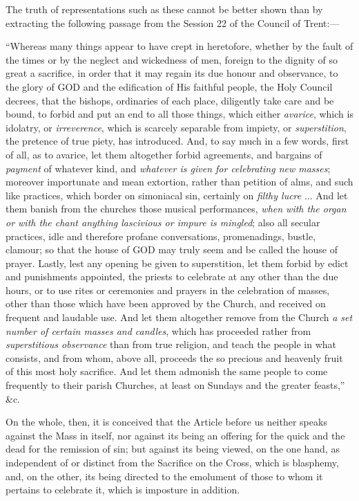 The truth of representations such as these cannot be better shown
than by extracting the following passage from the Session 22 of the
Council of Trent:—

``Whereas many things appear to have crept in
heretofore, whether by the fault of the times or by the neglect and
wickedness of men, foreign to the dignity of so great a sacrifice, in
order that it may regain its due honour and observance, to the glory
of GOD and the edification
of His faithful people, the Holy Council decrees, that the bishops,
ordinaries of each place, diligently take care and be bound, to forbid
and put an end to all those things, which either \emph{avarice}, which
is idolatry, or \emph{irreverence}, which is scarcely separable from
impiety, or \emph{superstition}, the pretence of true piety, has
introduced. And, to say much in a few words, first of all, as to
avarice, let them altogether forbid agreements, and bargains of \emph{payment}
of whatever kind, and \emph{whatever is given for celebrating new masses};
moreover importunate and mean extortion, rather than petition of alms,
and such like practices, which border on simoniacal sin, certainly on \emph{filthy
lucre} ... And let them banish from the churches those musical
performances, \emph{when with the organ or with the chant anything
lascivious or impure is mingled}; also all secular practices, idle
and therefore profane conversations, promenadings, bustle, clamour; so
that the house of GOD may
truly seem and be called the house of prayer. Lastly, lest any opening
be given to superstition, let them forbid by edict and punishments
appointed, the priests to celebrate at any other than the due hours,
or to use rites or ceremonies and prayers in the celebration of
masses, other than those which have been approved by the Church, and
received on frequent and laudable use. And let them altogether remove
from the Church \emph{a set number of certain masses and candles},
which has proceeded rather from \emph{superstitious observance} than
from true religion, and teach the people in what consists, and from
whom, above all, proceeds the so precious and heavenly fruit of this
most holy sacrifice. And let them admonish the same people to come
frequently to their parish Churches, at least on Sundays and the
greater feasts,'' \&c.

On the whole, then, it is conceived that the Article before us
neither speaks against the Mass in itself, nor against its being an
offering for the quick and the dead for the remission of sin; but
against its being viewed, on the one hand, as independent of or
distinct from the Sacrifice on the Cross, which is blasphemy, and, on
the other, its being directed to the emolument of those to whom it
pertains to celebrate it, which is imposture in addition.

